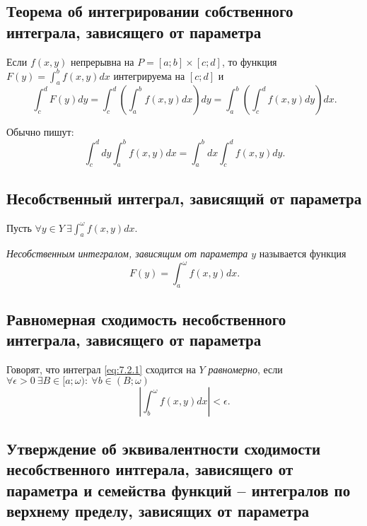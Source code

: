 \subsection{Теорема об интегрировании собственного интеграла, зависящего от параметра}

\begin{theorem}\label{theorem:7.1.3}
    Если $ f(x,y) $ непрерывна на $ P = [a;b] \times [c;d] $, то функция $ F(y) = \int_{a}^{b}f(x,y)dx $ интегрируема на $ [c;d] $ и
    \[
        \int_{c}^{d}F(y)dy = \int_{c}^{d}\left(\int_{a}^{b}f(x,y)dx\right)dy = \int_{a}^{b}\left(\int_{c}^{d}f(x,y)dy\right)dx.
    \]

    Обычно пишут:
    \[
        \int_{c}^{d}dy \int_{a}^{b}f(x,y)dx = \int_{a}^{b}dx \int_{c}^{d}f(x,y)dy.
    \]
\end{theorem}

\subsection{Несобственный интеграл, зависящий от параметра}

\begin{definition}
    Пусть $ \forall y \in Y \ \exists \int_{a}^{\omega}f(x,y)dx $.

    \emph{Несобственным интегралом, зависящим от параметра $ y $} называется функция
    \begin{equation}\label{eq:7.2.1}
        F(y) = \int_{a}^{\omega}f(x,y)dx.
    \end{equation}
\end{definition}

\subsection{Равномерная сходимость несобственного интеграла, зависящего от параметра}

\begin{definition}
    Говорят, что интеграл \ref{eq:7.2.1} сходится на $ Y $ \emph{равномерно}, если $ \forall \epsilon > 0 \ \exists B \in [a;\omega): \ \forall b \in (B;\omega) $
    \[
        \left|\int_{b}^{\omega}f(x,y)dx\right| < \epsilon.
    \]
\end{definition}

\subsection{Утверждение об эквивалентности сходимости несобственного интгерала, зависящего от параметра и семейства функций – интегралов по верхнему пределу, зависящих от параметра}

